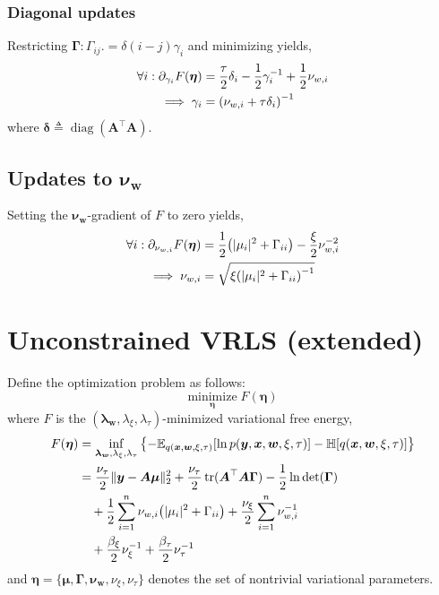 \documentclass{article}
\numberwithin{equation}{section}
\newcommand{\lh}{\mathopen{}\mathclose\bgroup\left}
\newcommand{\rh}{\aftergroup\egroup\right}
\newcommand{\entropy}[1]{\mathbb{H}\lh[ #1 \rh]}
\newcommand{\E}[2]{\mathbb{E}_{#2}\lh[ #1 \rh]}
\newcommand{\m}[1]{\boldsymbol{#1}}
\DeclareMathOperator{\trace}{tr}
\DeclareMathOperator{\diag}{diag}
\begin{document}
\subsubsection{Diagonal updates}
Restricting $\m{\Gamma} : \Gamma_{ij}.= \delta(i-j) \gamma_i$ and
minimizing yields,
\begin{equation}
\begin{aligned}
\forall i : \partial_{\gamma_i} F(\m{\eta}) &=
 \frac{\tau}{2} \delta_i - \frac{1}{2} \gamma_i^{-1} +
 \frac{1}{2} \nu_{w,i}
\\ \implies
\gamma_i &= \lh( \nu_{w,i} + \tau \delta_i \rh)^{-1}
\end{aligned}
\end{equation}
where $\m{\delta} \triangleq \diag(\m{A}^\top \m{A})$.

\subsection{Updates to $\m{\nu_w}$}
Setting the $\m{\nu_w}$-gradient of $F$ to zero yields,
\begin{equation}
\begin{aligned}
\forall i : \partial_{\nu_{w,i}} F(\m{\eta}) &=
 \frac{1}{2} \lh( |\mu_i|^2 + \Gamma_{ii} \rh) -
 \frac{\xi}{2} \nu_{w,i}^{-2}
\\ \implies
\nu_{w,i} &=
 \sqrt{\xi \lh( |\mu_i|^2 + \Gamma_{ii} \rh)^{-1}}
\end{aligned}
\end{equation}

\clearpage
\section{Unconstrained VRLS (extended)}
\label{s:vrls_ex}
Define the optimization problem as follows:
\begin{equation}
\underset{\m{\eta}}{\text{minimize}} \; F(\m{\eta})
\end{equation}
where $F$ is the $(\m{\lambda_w},\lambda_\xi,\lambda_\tau)$-minimized
variational free energy,
\begin{equation}
\begin{aligned}
F(\m{\eta}) &=
 \underset{\m{\lambda_w},\lambda_\xi,\lambda_\tau}{\inf}\left\{
 -\E{\ln p(\m{y}, \m{x}, \m{w}, \xi, \tau)}{q(\m{x}, \m{w}, \xi, \tau)}
 -\entropy{q(\m{x}, \m{w}, \xi, \tau)}
 \right\}
\\ &=
  \frac{\nu_\tau}{2} \| \m{y} - \m{A} \m{\mu} \|_2^2
 +\frac{\nu_\tau}{2} \trace(\m{A}^\top \m{A} \m{\Gamma})
 -\frac{1}{2} \ln\det(\m{\Gamma})
\\ &\quad
 +\frac{1}{2} \sum_{i=1}^n \nu_{w,i} \lh( |\mu_i|^2 + \Gamma_{ii} \rh)
 +\frac{\nu_\xi}{2} \sum_{i=1}^n \nu_{w,i}^{-1}
\\ &\quad
 +\frac{\beta_\xi}{2} \nu_\xi^{-1}
 +\frac{\beta_\tau}{2} \nu_\tau^{-1}
\end{aligned}
\end{equation}
and $\m{\eta} = \{\m{\mu}, \m{\Gamma}, \m{\nu_w}, \nu_\xi, \nu_\tau \}$
denotes the set of nontrivial variational parameters.
\end{document}
